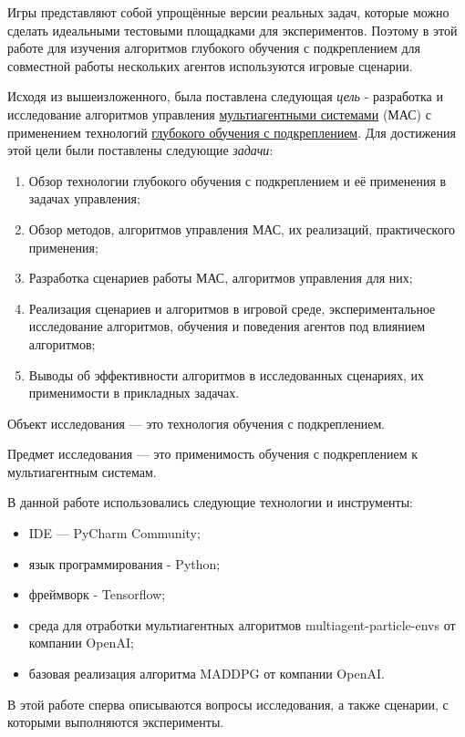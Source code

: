Игры представляют собой упрощённые версии реальных задач, которые можно сделать идеальными тестовыми площадками для экспериментов. Поэтому в этой работе для изучения алгоритмов глубокого обучения с подкреплением для совместной работы нескольких агентов используются игровые сценарии.

Исходя из вышеизложенного, была поставлена следующая \textit{цель} - разработка и исследование алгоритмов управления \hyperref[acr:rl]{мультиагентными системами} (МАС) с применением технологий \hyperref[acr:drl]{глубокого обучения с подкреплением}. Для достижения этой цели были поставлены следующие \textit{задачи}:

\begin{enumerate}
	\item Обзор технологии глубокого обучения с подкреплением и её применения в задачах управления;
	\item Обзор методов, алгоритмов управления МАС, их реализаций, практического применения;
	\item Разработка сценариев работы МАС, алгоритмов управления для них;
	\item Реализация сценариев и алгоритмов в игровой среде, экспериментальное исследование алгоритмов, обучения и поведения агентов под влиянием алгоритмов;
	\item Выводы об эффективности алгоритмов в исследованных сценариях, их применимости в прикладных задачах. 
\end{enumerate}

Объект исследования --- это технология обучения с подкреплением.

Предмет исследования --- это применимость обучения с подкреплением к мультиагентным системам.

В данной работе использовались следующие технологии и инструменты:

\begin{itemize}
	\item IDE --- PyCharm Community;
	\item язык программирования - Python;
	\item фреймворк - Tensorflow;
	\item среда для отработки мультиагентных алгоритмов multiagent-particle-envs \cite{multiagent-particle-envs} от компании OpenAI;
	\item базовая реализация алгоритма MADDPG \cite{lowe2017multiagent} от компании OpenAI.
\end{itemize}

В этой работе сперва описываются вопросы исследования, а также сценарии, с которыми выполняются эксперименты.

